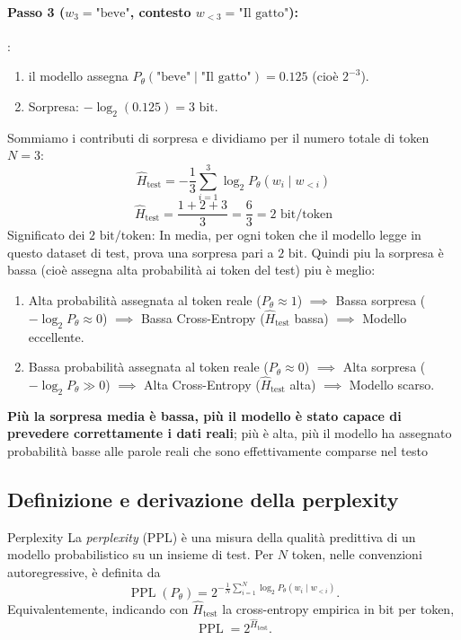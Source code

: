 \begin{example}{}
    \paragraph{Passo 3 ($w_3 = \text{"beve"}$, contesto $w_{<3} = \text{"Il gatto"}$):} :
    \begin{enumerate}
        \item il modello assegna $P_\theta(\text{"beve"} \mid \text{"Il gatto"}) = 0.125$ (cioè $2^{-3}$).
        \item Sorpresa: $-\log_2(0.125) = 3 \text{ bit}$.
    \end{enumerate} 
    Sommiamo i contributi di sorpresa e dividiamo per il numero totale di token $N = 3$:   $$\hat{H}_{\text{test}} = -\frac{1}{3} \sum_{i=1}^3 \log_2 P_\theta(w_i \mid w_{<i})$$
    $$\hat{H}_{\text{test}} = \frac{1 + 2 + 3}{3} = \frac{6}{3} = 2 \text{ bit/token}$$     
    Significato dei $2 \text{ bit/token}$: In media, per ogni token che il modello legge in questo dataset di test, prova una sorpresa pari a $2 \text{ bit}$. 
Quindi piu la sorpresa è bassa (cioè assegna alta probabilità ai token del test) piu è meglio:
\begin{enumerate}
    \item Alta probabilità assegnata al token reale ($P_\theta \approx 1$) $\implies$ Bassa sorpresa ($-\log_2 P_\theta \approx 0$) $\implies$ Bassa Cross-Entropy ($\hat{H}_{\text{test}}$ bassa) $\implies$ Modello eccellente.
    \item Bassa probabilità assegnata al token reale ($P_\theta \approx 0$) $\implies$ Alta sorpresa ($-\log_2 P_\theta \gg 0$) $\implies$ Alta Cross-Entropy ($\hat{H}_{\text{test}}$ alta) $\implies$ Modello scarso.
\end{enumerate}
\end{example}
\textbf{Più la sorpresa media è bassa, più il modello è stato capace di prevedere correttamente i dati reali}; più è alta, più il modello ha assegnato probabilità basse alle parole reali che sono effettivamente comparse nel testo


\newpage
\subsection{Definizione e derivazione della perplexity}

\begin{definition}{Perplexity}
La \emph{perplexity} (PPL) è una misura della qualità predittiva di un modello probabilistico su un insieme di test. Per $N$ token, nelle convenzioni autoregressive, è definita da
\begin{equation}\label{eq:ppl}
\boxed{\operatorname{PPL}(P_\theta)=2^{-\frac1N\sum_{i=1}^{N}\log_2 P_\theta(w_i\mid w_{<i})}}.
\end{equation}
Equivalentemente, indicando con $\widehat H_{\mathrm{test}}$ la cross-entropy empirica in bit per token,
\begin{equation}
\boxed{\operatorname{PPL}=2^{\widehat H_{\mathrm{test}}}}.
\end{equation}
\end{definition}

